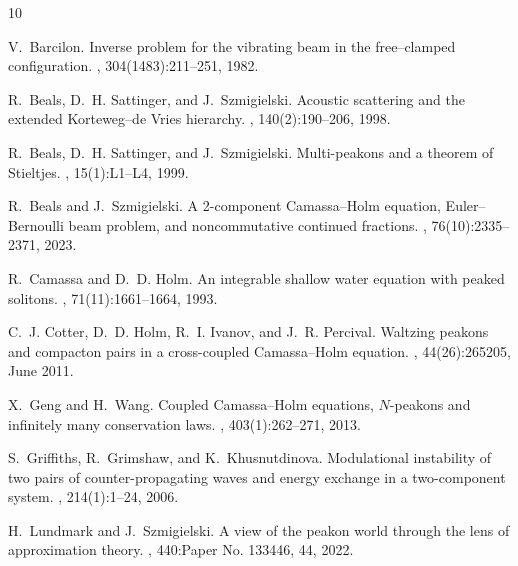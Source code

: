 \documentclass[10pt,a4paper]{article}
\numberwithin{equation}{section}
\theoremstyle{plain}
\theoremstyle{definition}
\begin{document}
\def\cydot{\leavevmode\raise.4ex\hbox{.}}
  \def\cydot{\leavevmode\raise.4ex\hbox{.}}
\begin{thebibliography}{10}

V.~Barcilon.
\newblock Inverse problem for the vibrating beam in the free--clamped
  configuration.
, 304(1483):211--251, 1982.

R.~Beals, D.~H. Sattinger, and J.~Szmigielski.
\newblock Acoustic scattering and the extended {Korteweg}--de {Vries}
  hierarchy.
, 140(2):190--206, 1998.

R.~Beals, D.~H. Sattinger, and J.~Szmigielski.
\newblock Multi-peakons and a theorem of {S}tieltjes.
, 15(1):L1--L4, 1999.

R.~Beals and J.~Szmigielski.
\newblock A 2-component {C}amassa--{H}olm equation, {E}uler--{B}ernoulli beam
  problem, and noncommutative continued fractions.
, 76(10):2335--2371, 2023.

R.~Camassa and D.~D. Holm.
\newblock An integrable shallow water equation with peaked solitons.
, 71(11):1661--1664, 1993.

C.~J. Cotter, D.~D. Holm, R.~I. Ivanov, and J.~R. Percival.
\newblock Waltzing peakons and compacton pairs in a cross-coupled
  {C}amassa--{H}olm equation.
,
  44(26):265205, June 2011.

X.~Geng and H.~Wang.
\newblock Coupled {C}amassa--{H}olm equations, {$N$}-peakons and infinitely
  many conservation laws.
, 403(1):262--271, 2013.

S.~Griffiths, R.~Grimshaw, and K.~Khusnutdinova.
\newblock Modulational instability of two pairs of counter-propagating waves
  and energy exchange in a two-component system.
, 214(1):1--24, 2006.

H.~Lundmark and J.~Szmigielski.
\newblock A view of the peakon world through the lens of approximation theory.
, 440:Paper No. 133446, 44, 2022.


\end{thebibliography}
\end{document}
